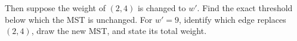 \documentclass[9pt]{book}
\begin{document}
\begin{enumerate}[label=\arabic*.]
\begin{enumerate}[label=(\alph*)]
    Then suppose the weight of $(2,4)$ is changed to $w'$.  Find the exact threshold below which the MST is unchanged.  For $w' = 9$, identify which edge replaces $(2,4)$, draw the new MST, and state its total weight.

\end{enumerate}

\end{enumerate}
\end{document}
